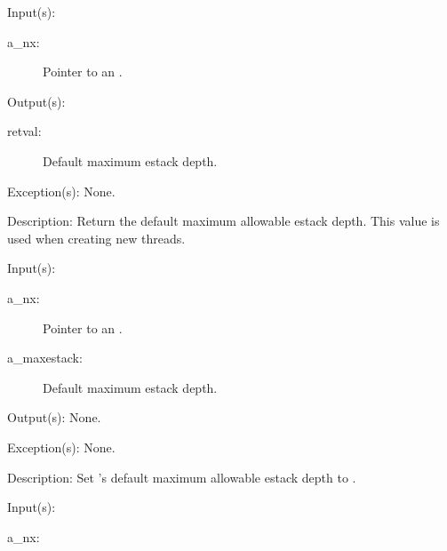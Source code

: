 \begin{capi}
\label{nx_maxestack_get}
	\begin{capilist}
	\item[Input(s): ]
		\begin{description}\item[]
		\item[a\_nx: ]
			Pointer to an .
		\end{description}
	\item[Output(s): ]
		\begin{description}\item[]
		\item[retval: ]
			Default maximum estack depth.
		\end{description}
	\item[Exception(s): ] None.
	\item[Description: ]
		Return the default maximum allowable estack depth.  This value
		is used when creating new threads.
	\end{capilist}
\label{nx_maxestack_set}
	\begin{capilist}
	\item[Input(s): ]
		\begin{description}\item[]
		\item[a\_nx: ]
			Pointer to an \classname{nx}.
		\item[a\_maxestack: ]
			Default maximum estack depth.
		\end{description}
	\item[Output(s): ] None.
	\item[Exception(s): ] None.
	\item[Description: ]
		Set 's default maximum allowable estack depth to
		\cvar{a\_maxestack}.
	\end{capilist}
\label{nx_tailopt_get}
	\begin{capilist}
	\item[Input(s): ]
		\begin{description}\item[]
		\item[a\_nx: ]

\end{description}
\end{capilist}
\end{capi}

